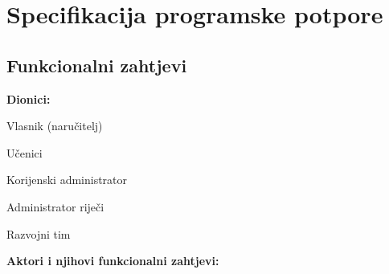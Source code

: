 \chapter{Specifikacija programske potpore}
		
\section{Funkcionalni zahtjevi}

\noindent \textbf{Dionici:}
			
\begin{packed_enum}
	
	\item Vlasnik (naručitelj)
	\item Učenici				
	\item Korijenski administrator
	\item Administrator riječi
	\item Razvojni tim
	
\end{packed_enum}

\noindent \textbf{Aktori i njihovi funkcionalni zahtjevi:}
			
